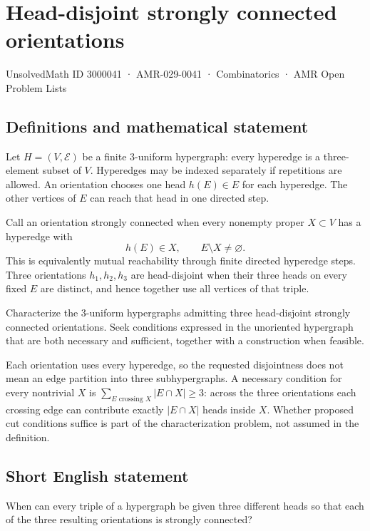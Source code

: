 \documentclass[11pt,a4paper]{article}
\begin{document}
\section*{Head-disjoint strongly connected orientations}\label{3000041}
{\small UnsolvedMath ID 3000041 · AMR-029-0041 · Combinatorics · AMR Open Problem Lists}
\subsection{Definitions and mathematical statement}
Let $H=(V,\mathcal E)$ be a finite $3$-uniform hypergraph: every
hyperedge is a three-element subset of $V$. Hyperedges may be indexed
separately if repetitions are allowed. An orientation chooses one
head $h(E)\in E$ for each hyperedge. The other vertices of $E$ can
reach that head in one directed step.

Call an orientation strongly connected when every nonempty proper
$X\subset V$ has a hyperedge with
\[
                         h(E)\in X,\qquad E\setminus X\ne\varnothing.
\]
This is equivalently mutual reachability through finite directed
hyperedge steps. Three orientations $h_1,h_2,h_3$ are head-disjoint
when their three heads on every fixed $E$ are distinct, and hence
together use all vertices of that triple.

Characterize the $3$-uniform hypergraphs admitting three head-disjoint
strongly connected orientations. Seek conditions expressed in the
unoriented hypergraph that are both necessary and sufficient, together
with a construction when feasible.

Each orientation uses every hyperedge, so the requested disjointness
does not mean an edge partition into three subhypergraphs. A necessary
condition for every nontrivial $X$ is
$\sum_{E\text{ crossing }X}|E\cap X|\ge3$: across the three orientations
each crossing edge can contribute exactly $|E\cap X|$ heads inside $X$.
Whether proposed cut conditions suffice is part of the characterization
problem, not assumed in the definition.
\subsection{Short English statement}
When can every triple of a hypergraph be given three different
heads so that each of the three resulting orientations is strongly connected?
\end{document}
